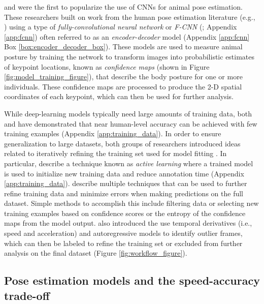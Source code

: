 \documentclass[11pt,a4paper,oneside]{book}
\begin{document}
\cite{mathis2018deeplabcut} and \cite{pereira2019fast} were the first to popularize the use of CNNs for animal pose estimation. These researchers built on work from the human pose estimation literature (e.g., \citealt{andriluka14cvpr,insafutdinov2016deepercut,newell2016}) using a type of \textit{fully-convolutional neural network} or \textit{F-CNN} (\citealt{long2015fully}; Appendix \ref{app:fcnn}) often referred to as an \textit{encoder-decoder} model (Appendix \ref{app:fcnn} Box \ref{box:encoder_decoder_box}). These models are used to measure animal posture by training the network to transform images into probabilistic estimates of keypoint locations, known as \textit{confidence maps} (shown in Figure \ref{fig:model_training_figure}), that describe the body posture for one or more individuals. These confidence maps are processed to produce the 2-D spatial coordinates of each keypoint, which can then be used for further analysis. 

While deep-learning models typically need large amounts of training data, both \cite{mathis2018deeplabcut} and \cite{pereira2019fast} have demonstrated that near human-level accuracy can be achieved with few training examples (Appendix \ref{app:training_data}). In order to ensure generalization to large datasets, both groups of researchers introduced ideas related to iteratively refining the training set used for model fitting \citep{mathis2018deeplabcut, pereira2019fast}. In particular, \cite{pereira2019fast} describe a technique known as \textit{active learning} where a trained model is used to initialize new training data and reduce annotation time (Appendix \ref{app:training_data}). \cite{mathis2018deeplabcut} describe multiple techniques that can be used to further refine training data and minimize errors when making predictions on the full dataset. Simple methods to accomplish this include filtering data or selecting new training examples based on confidence scores or the entropy of the confidence maps from the model output. \cite{nath2018} also introduced the use temporal derivatives (i.e., speed and acceleration) and autoregressive models to identify outlier frames, which can then be labeled to refine the training set or excluded from further analysis on the final dataset (Figure \ref{fig:workflow_figure}).

\subsection{Pose estimation models and the speed-accuracy trade-off}
\end{document}
